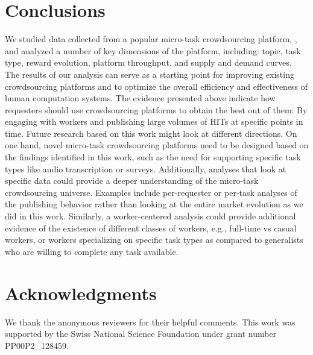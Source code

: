 \section{Conclusions}\label{sec:conc}
We studied data collected from a popular micro-task crowdsourcing platform, \amt{},
and analyzed a number of key dimensions of the platform, including: topic, task type, reward evolution, platform throughput, and supply and demand curves. The results of our analysis can serve as a starting point for improving existing crowdsourcing platforms and to optimize the overall efficiency and effectiveness of human computation systems. The evidence presented above indicate how requesters should use crowdsourcing platforms to obtain the best out of them: By engaging with workers and publishing large volumes of HITs at specific points in time. 
Future research based on this work might look at different directions. On one hand, novel micro-task crowdsourcing platforms need to be designed based on the findings identified in this work, such as the need for supporting specific task types like audio transcription or surveys. 
Additionally, analyses that look at specific data could provide a deeper understanding of the micro-task crowdsourcing universe. Examples include per-requester or per-task analyses of the publishing behavior rather than looking at the entire market evolution as we did in this work.
Similarly, a worker-centered analysis could provide additional evidence of the existence of different classes of workers, e.g., full-time vs casual workers, or workers specializing on specific task types as compared to generalists who are willing to complete any task available.

\section{Acknowledgments}
We thank the anonymous reviewers for their helpful comments.
%
This work was supported by the Swiss National Science Foundation under grant number PP00P2\_128459.